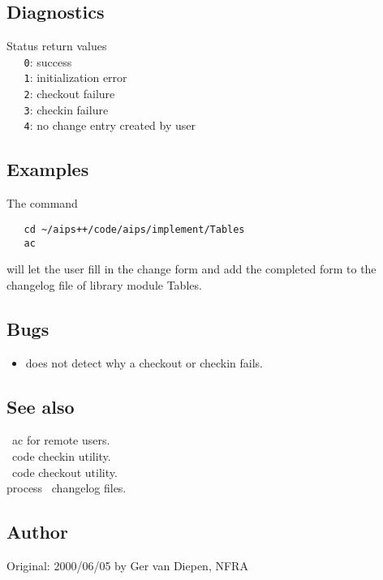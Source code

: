 \subsection*{Diagnostics}

Status return values
\\ \verb+   0+: success
\\ \verb+   1+: initialization error
\\ \verb+   2+: checkout failure
\\ \verb+   3+: checkin failure
\\ \verb+   4+: no change entry created by user

\subsection*{Examples}

The command

\begin{verbatim}
   cd ~/aips++/code/aips/implement/Tables
   ac
\end{verbatim}

\noindent
will let the user fill in the change form and add the completed
form to the changelog file of library module Tables.

\subsection*{Bugs}

\begin{itemize}
\item
    does not detect why a checkout or checkin fails.
\end{itemize}

\subsection*{See also}

 \aipspp\ ac for remote users.\\
 \aipspp\ code checkin utility.\\
 \aipspp\ code checkout utility.\\
 process \aipspp\ changelog files.

\subsection*{Author}

Original: 2000/06/05 by Ger van Diepen, NFRA

